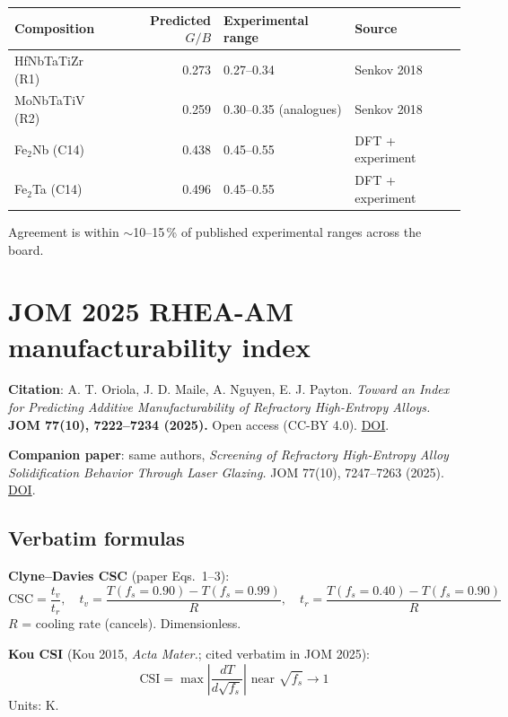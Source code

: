 \documentclass[11pt,a4paper]{article}
\begin{document}
\begin{center}
\begin{tabular}{lrll}
\toprule
\textbf{Composition} & \textbf{Predicted $G/B$} & \textbf{Experimental range} & \textbf{Source}\\
\midrule
HfNbTaTiZr (R1) & 0.273 & 0.27--0.34 & Senkov 2018 \\
MoNbTaTiV (R2)  & 0.259 & 0.30--0.35 (analogues) & Senkov 2018 \\
Fe$_2$Nb (C14)  & 0.438 & 0.45--0.55 & DFT + experiment \\
Fe$_2$Ta (C14)  & 0.496 & 0.45--0.55 & DFT + experiment \\
\bottomrule
\end{tabular}
\end{center}

Agreement is within $\sim$10--15\,\% of published experimental ranges across
the board.

\section{JOM 2025 RHEA-AM manufacturability index}
\label{sec:jom}

\textbf{Citation}: A. T. Oriola, J. D. Maile, A. Nguyen, E. J. Payton.
\emph{Toward an Index for Predicting Additive Manufacturability of Refractory
High-Entropy Alloys.} \textbf{JOM 77(10), 7222--7234 (2025).} Open access
(CC-BY 4.0). \href{https://doi.org/10.1007/s11837-025-07552-3}{DOI}.

\textbf{Companion paper}: same authors, \emph{Screening of Refractory
High-Entropy Alloy Solidification Behavior Through Laser Glazing.} JOM 77(10),
7247--7263 (2025). \href{https://doi.org/10.1007/s11837-025-07620-8}{DOI}.

\subsection{Verbatim formulas}

\textbf{Clyne--Davies CSC} (paper Eqs.~1--3):
\[
\text{CSC} = \frac{t_v}{t_r}, \quad
t_v = \frac{T(f_s = 0.90) - T(f_s = 0.99)}{R}, \quad
t_r = \frac{T(f_s = 0.40) - T(f_s = 0.90)}{R}
\]
$R$ = cooling rate (cancels). Dimensionless.

\textbf{Kou CSI} (Kou 2015, \emph{Acta Mater.}; cited verbatim in JOM 2025):
\[
\text{CSI} = \max \left| \frac{dT}{d\sqrt{f_s}} \right| \text{ near } \sqrt{f_s} \to 1
\]
Units: K.
\end{document}
